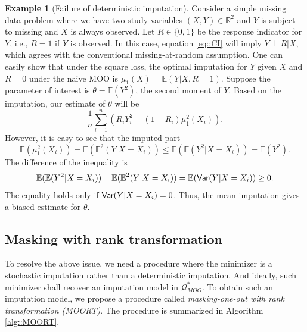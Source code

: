 \documentclass[aos, preprint]{imsart}
\theoremstyle{plain}
\theoremstyle{definition}
\newtheorem*{example}{Example}
\newcommand{\E}{\mbox{$\mathbb{E}$}}
\newcommand{\R}{\mbox{$\mathbb{R}$}}
\begin{document}
\begin{example}[Failure of deterministic imputation]
Consider a simple missing data problem where we have two study variables $(X,Y)\in\R^2$
and $Y$ is subject to missing and $X$ is always observed.
Let $R\in\{0,1\}$  be the response indicator for $Y$, i.e., $R=1$ if $Y$ is observed. 
In this case, equation \eqref{eq::CI} will imply $Y\perp R|X$, 
which agrees with the conventional missing-at-random assumption. 
One can easily show that under the square loss, the optimal imputation for $Y$ given $X$ and $R=0$ under the naive MOO
is $ \mu_1(X) = \E(Y|X, R=1)$. 
Suppose the parameter of interest is $\theta = \E(Y^2)$, the second moment of $Y$. 
Based on the imputation, our estimate of $\theta $ will be 
$$
\frac{1}{n}\sum_{i=1}^n \left(R_i Y_i^2 + (1-R_i) \mu^2_1(X_i)\right).
$$
However, it is easy to see that the imputed part
$$
\E(\mu^2_1(X_i)) = \E(\E^2(Y|X= X_i))\leq \E(\E(Y^2|X= X_i))  = \E(Y^2).
$$
The difference of the inequality is 
$$
\E(\E(Y^2|X= X_i)) - \E(\E^2(Y|X= X_i)) = \E({\sf Var}(Y|X=X_i))\geq 0.
$$
The equality holds only if ${\sf Var}(Y|X=X_i) = 0$.
Thus, the mean imputation gives a biased estimate for $\theta$.
\end{example}


\subsection{Masking with rank transformation}
To resolve the above issue, we need a procedure where the minimizer is
a stochastic imputation rather than a deterministic imputation.
And ideally, such minimizer shall recover an imputation model in $\mathcal{Q}^*_{MOO}$.
To obtain such an imputation model, we propose a procedure called \emph{masking-one-out with rank transformation (MOORT)}. 
The procedure is summarized in Algorithm \ref{alg::MOORT}.
\end{document}
